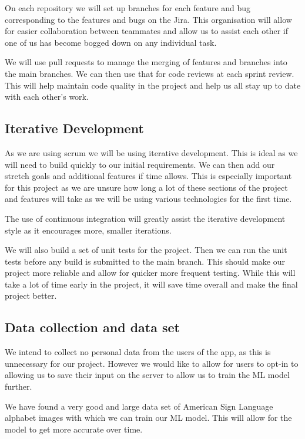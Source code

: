 \documentclass[10pt]{article}
\begin{document}
On each repository we will set up branches for each feature and bug corresponding to the features 
and bugs on the Jira. This organisation will allow for easier collaboration between teammates and 
allow us to assist each other if one of us has become bogged down on any individual task.

We will use pull requests to manage the merging of features and branches into the main branches. We 
can then use that for code reviews at each sprint review. This will help maintain code quality in 
the project and help us all stay up to date with each other's work.

\subsection{Iterative Development}

As we are using scrum we will be using iterative development. This is ideal as we will need to build 
quickly to our initial requirements. We can then add our stretch goals and additional features if 
time allows. This is especially important for this project as we are unsure how long a lot of these 
sections of the project and features will take as we will be using various technologies for the 
first time. 

The use of continuous integration will greatly assist the iterative development style as it 
encourages more, smaller iterations.

We will also build a set of unit tests for the project. Then we can run the unit tests before any 
build is submitted to the main branch. This should make our project more reliable and allow for 
quicker more frequent testing. While this will take a lot of time early in the project, it will save 
time overall and make the final project better.

\subsection{Data collection and data set}

We intend to collect no personal data from the users of the app, as this is unnecessary for our 
project. However we would like to allow for users to opt-in to allowing us to save their input on 
the server to allow us to train the ML model further. 

We have found a very good and large data set of American Sign Language alphabet images with which we 
can train our ML model. This will allow for the model to get more accurate over time.
\end{document}
